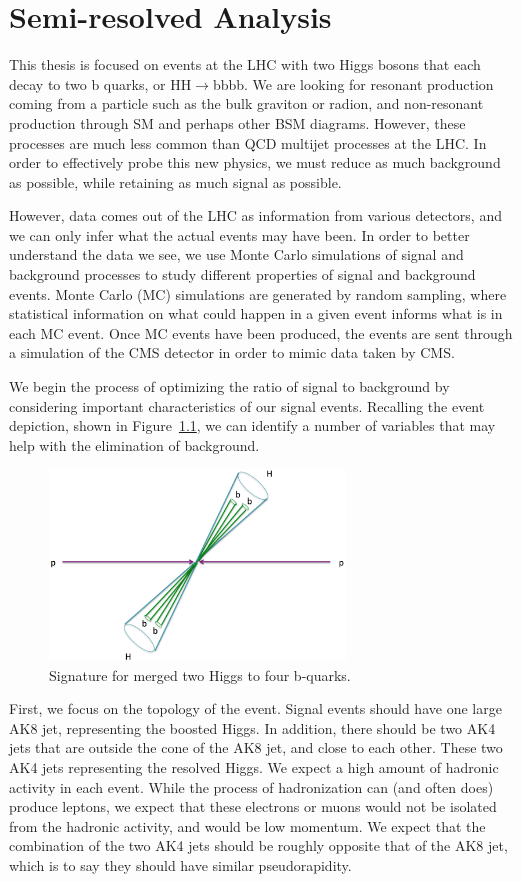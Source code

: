 \chapter{Semi-resolved Analysis}\label{Sec:Ana}

This thesis is focused on events at the LHC with two Higgs bosons that each decay to two b quarks, or HH$\rightarrow$bbbb. We are looking for resonant production coming from a particle such as the bulk graviton or radion, and non-resonant production through SM and perhaps other BSM diagrams. However, these processes are much less common than QCD multijet processes at the LHC. In order to effectively probe this new physics, we must reduce as much background as possible, while retaining as much signal as possible.

However, data comes out of the LHC as information from various detectors, and we can only infer what the actual events may have been. In order to better understand the data we see, we use Monte Carlo simulations of signal and background processes to study different properties of signal and background events. Monte Carlo (MC) simulations are generated by random sampling, where statistical information on what could happen in a given event informs what is in each MC event. Once MC events have been produced, the events are sent through a simulation of the CMS detector in order to mimic data taken by CMS.

We begin the process of optimizing the ratio of signal to background by considering important characteristics of our signal events. Recalling the event depiction, shown in Figure~\ref{Fig:threecases2again}, we can identify a number of variables that may help with the elimination of background.
\begin{figure}[h!]
    \centering
        \includegraphics[width=0.7\textwidth]{F4/merged.png}
        \caption{Signature for merged two Higgs to four b-quarks.}
        \label{Fig:threecases2again}
\end{figure}
First, we focus on the topology of the event. Signal events should have one large AK8 jet, representing the boosted Higgs. In addition, there should be two AK4 jets that are outside the cone of the AK8 jet, and close to each other. These two AK4 jets representing the resolved Higgs. We expect a high amount of hadronic activity in each event. While the process of hadronization can (and often does) produce leptons, we expect that these electrons or muons would not be isolated from the hadronic activity, and would be low momentum. We expect that the combination of the two AK4 jets should be roughly opposite that of the AK8 jet, which is to say they should have similar pseudorapidity. 

